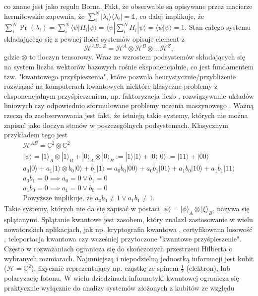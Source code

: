 \documentclass[10pt]{article} %
\newcommand{\Hx}[1]{\mathcal{H}^{#1}}
\newcommand{\Pro}[1]{\Pr(#1)}
\newcommand{\Ket}[1]{|#1\rangle}
\newcommand{\Bra}[1]{\langle#1|}
\newcommand{\Braket}[1]{\langle#1\rangle}
\newcommand{\KP}{\Ket{\psi}}
\newcommand{\BP}{\Bra{\psi}}
\begin{document}
co znane jest jako reguła Borna. Fakt, że obserwable są opisywane przez macierze hermitowskie zapewnia, że $\sum^N_i \Ket{\lambda_i}\Bra{\lambda_i} = \mathbb{1}$, co dalej implikuje, że $\sum^N_i \Pro{\lambda_i} = \sum^N_i \BP \Pi_i \KP = \BP \sum^N_i \Pi_i \KP = \Braket{\psi | \psi} = 1$.
Stan całego systemu składającego się z pewnej ilości systemów opisuje element z
\begin{equation}
\Hx{AB\dots Z} = \Hx{A} \otimes \Hx{B} \otimes \dots \Hx{Z},
\end{equation}
gdzie $\otimes$ to iloczyn tensorowy. Wraz ze wzrostem podsystemów składających się na system liczba wektorów bazowych rośnie eksponencjalnie, co jest fundamentem tzw. "kwantowego przyśpieszenia", które pozwala heurystycznie/przybliżenie rozwiązać na komputerach kwantowych niektóre klasyczne problemy z eksponencjalnym przyśpieszeniem,
np. faktoryzacja liczb \cite{shor}, rozwiązywanie układów liniowych \cite{soeq} czy odpowiednio sformułowane problemy uczenia maszynowego \cite{qsvm, qpca}.
Ważną rzeczą do zaobserwowania jest fakt, że istnieją takie systemy, których nie można zapisać jako iloczyn stanów w poszczególnych podsystemach. Klasycznym przykładem tego jest
\begin{gather*}
\Hx{AB} = \mathds{C}^2 \otimes \mathds{C}^2 \\
\KP = \Ket{1}_A \otimes \Ket{1}_B + \Ket{0}_A \otimes \Ket{0}_B := \Ket{1}\Ket{1} + \Ket{0}\Ket{0} := \Ket{11} + \Ket{00} \\
a_0\Ket{0} + a_1\Ket{1} \otimes b_0\Ket{0} + b_1\Ket{1} = a_0b_0 \Ket{00} + a_0b_1\Ket{01} + a_1b_0\Ket{10} + a_1b_1\Ket{11} \\
a_0b_1 = 0\implies a_0 = 0\vee b_1 = 0 \\
a_1b_0 = 0\implies a_1 = 0\vee b_0 = 0 \\
\text{Powyższe implikuje, że } a_0b_0 \neq 1 \vee a_1b_1 \neq 1.
\end{gather*} Takie systemy, których nie da się zapisać w postaci $\Ket{\psi} = \Ket{\phi}_A \otimes \Ket{\xi}_B$, nazywa się splątanymi. Splątanie kwantowe jest zasobem, który znalazł zastosowanie w wielu nowatorskich aplikacjach, jak np. kryptografia kwantowa \cite{crypto}, certyfikowana losowość \cite{rand}, teleportacja kwantowa \cite{qt} czy wcześniej przytoczone "kwantowe przyśpieszenie".
Często w rozważaniach ogranicza się do skończonych przestrzeni Hilberta o wybranych rozmiarach. Najmniejszą i niepodzielną jednostką informacji jest kubit ($\Hx{} = \mathds{C}^2$), fizycznie reprezentujący np. cząstkę ze spinem-$\frac{1}{2}$ (elektron), lub polaryzację fotonu. W wielu dziedzinach informatyki kwantowej ogranicza się praktycznie wyłącznie do analizy systemów złożonych z kubitów ze względu
\end{document}
